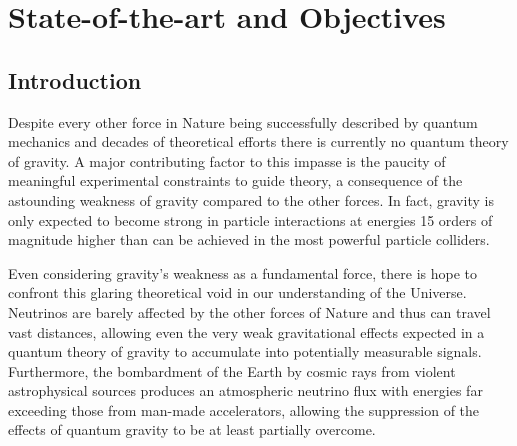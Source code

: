 \documentclass[a4paper,11pt]{article}
\newcounter{bar}
\begin{document}

\section{State-of-the-art and Objectives}
\vspace{0.1 cm}


\subsection{Introduction}


Despite every other force in Nature being successfully described by quantum mechanics and decades of theoretical efforts there is currently no quantum theory of gravity. A major contributing factor to this impasse is the paucity of meaningful experimental constraints to guide theory, a consequence of the astounding weakness of gravity compared to the other forces. In fact, gravity is only expected to become strong in particle interactions at energies 15 orders of magnitude higher than can be achieved in the most powerful particle colliders.

Even considering gravity's weakness as a fundamental force, there is hope to confront this glaring theoretical void in our understanding of the Universe. Neutrinos are barely affected by the other forces of Nature and thus can travel vast distances, allowing even the very weak gravitational effects expected in a quantum theory of gravity to accumulate into potentially measurable signals. Furthermore, the bombardment of the Earth by cosmic rays from violent astrophysical sources produces an atmospheric neutrino flux with energies far exceeding those from man-made accelerators, allowing the suppression of the effects of quantum gravity to be at least partially overcome.
\end{document}
